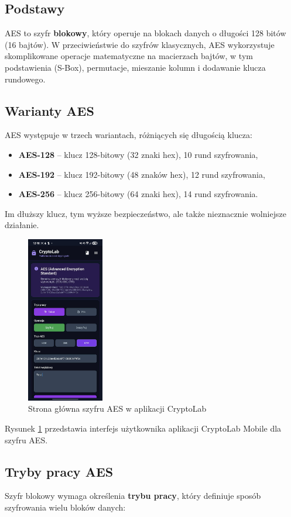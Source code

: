 \documentclass[12pt,a4paper]{article}
\begin{document}
\subsection{Podstawy}
AES to szyfr \textbf{blokowy}, który operuje na blokach danych o długości 128 bitów (16 bajtów). 
W przeciwieństwie do szyfrów klasycznych, AES wykorzystuje skomplikowane operacje matematyczne na macierzach bajtów, 
w tym podstawienia (S-Box), permutacje, mieszanie kolumn i dodawanie klucza rundowego.

\subsection{Warianty AES}
AES występuje w trzech wariantach, różniących się długością klucza:
\begin{itemize}
    \item \textbf{AES-128} -- klucz 128-bitowy (32 znaki hex), 10 rund szyfrowania,
    \item \textbf{AES-192} -- klucz 192-bitowy (48 znaków hex), 12 rund szyfrowania,
    \item \textbf{AES-256} -- klucz 256-bitowy (64 znaki hex), 14 rund szyfrowania.
\end{itemize}

Im dłuższy klucz, tym wyższe bezpieczeństwo, ale także nieznacznie wolniejsze działanie.
\begin{figure}[H]
    \centering
    \includegraphics[width=0.3\textwidth]{img/strona_glownaAES.jpg}
    \caption{Strona główna szyfru AES w aplikacji CryptoLab}
    \label{fig:aes_main}
\end{figure}
Rysunek \ref{fig:aes_main} przedstawia interfejs użytkownika aplikacji CryptoLab Mobile dla szyfru AES.
\subsection{Tryby pracy AES}
Szyfr blokowy wymaga określenia \textbf{trybu pracy}, który definiuje sposób szyfrowania wielu bloków danych:
\end{document}
